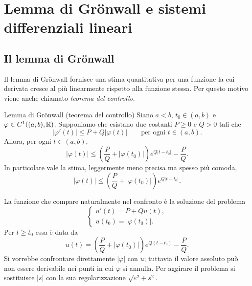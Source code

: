 \documentclass[a4paper]{article}
\begin{document}
\section{Lemma di Grönwall e sistemi differenziali lineari}

\subsection{Il lemma di Grönwall}

\begin{radioactive}
Il lemma di Grönwall fornisce una stima quantitativa per una funzione la cui derivata cresce al più linearmente rispetto alla funzione stessa. Per questo motivo viene anche chiamato \emph{teorema del controllo}.
\end{radioactive}

\begin{radioactive}
\begin{snippettheorem}{Lemma di Grönwall (teorema del controllo)}
Siano \(a<b\), \(t_0\in(a,b)\) e \(\varphi\in C^1((a,b),\mathbb{R})\). Supponiamo che esistano due costanti \(P\geq 0\) e \(Q>0\) tali che
\[
	|\varphi'(t)|\leq P+Q|\varphi(t)|
	\qquad\text{per ogni }t\in(a,b).
\]
Allora, per ogni \(t\in(a,b)\),
\[
	|\varphi(t)|
	\leq
	\left(\frac{P}{Q}+|\varphi(t_0)|\right)e^{Q|t-t_0|}-\frac{P}{Q}.
\]
In particolare vale la stima, leggermente meno precisa ma spesso più comoda,
\[
	|\varphi(t)|
	\leq
	\left(\frac{P}{Q}+|\varphi(t_0)|\right)e^{Q|t-t_0|}.
\]
\end{snippettheorem}
\end{radioactive}

\begin{radioactive}
La funzione che compare naturalmente nel confronto è la soluzione del problema
\[
	\begin{cases}
		u'(t)=P+Qu(t),\\
		u(t_0)=|\varphi(t_0)|.
	\end{cases}
\]
Per \(t\geq t_0\) essa è data da
\[
	u(t)=\left(\frac{P}{Q}+|\varphi(t_0)|\right)e^{Q(t-t_0)}-\frac{P}{Q}.
\]
Si vorrebbe confrontare direttamente \(|\varphi|\) con \(u\); tuttavia il valore assoluto può non essere derivabile nei punti in cui \(\varphi\) si annulla. Per aggirare il problema si sostituisce \(|s|\) con la sua regolarizzazione \(\sqrt{\varepsilon^2+s^2}\).

\begin{center}
\end{center}
\end{radioactive}
\end{document}
